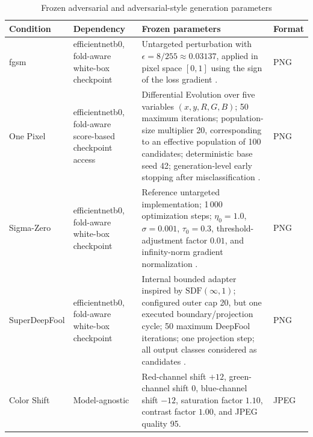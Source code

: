 \begin{table}[H]
\centering
\scriptsize
\renewcommand{\arraystretch}{1.18}
\setlength{\tabcolsep}{4pt}
\caption{Frozen adversarial and adversarial-style generation parameters}
\label{tab:implementation-adversarial-parameters}
\begin{tabularx}{\textwidth}{@{}p{} p{} X p{}@{}}
\toprule
\textbf{Condition} &
\textbf{Dependency} &
\textbf{Frozen parameters} &
\textbf{Format} \\
\midrule

\gls{fgsm}
&
\gls{efficientnetb0}, fold-aware white-box checkpoint
&
Untargeted perturbation with
\(\epsilon = 8/255 \approx 0.03137\), applied in pixel space
\([0,1]\) using the sign of the loss gradient
\cite{goodfellow2015explaining}.
&
PNG \\

One Pixel
&
\gls{efficientnetb0}, fold-aware score-based checkpoint access
&
Differential Evolution over five variables
\((x,y,R,G,B)\); 50 maximum iterations; population-size multiplier 20,
corresponding to an effective population of 100 candidates;
deterministic base seed 42; generation-level early stopping after misclassification
\cite{su2019onepixel}.
&
PNG \\

Sigma-Zero
&
\gls{efficientnetb0}, fold-aware white-box checkpoint
&
Reference untargeted implementation; 1\,000 optimization steps;
\(\eta_0 = 1.0\), \(\sigma = 0.001\), \(\tau_0 = 0.3\),
threshold-adjustment factor \(0.01\), and infinity-norm gradient
normalization \cite{zhao2024sigmazero}.
&
PNG \\

SuperDeepFool
&
\gls{efficientnetb0}, fold-aware white-box checkpoint
&
Internal bounded adapter inspired by \(\mathrm{SDF}(\infty,1)\);
configured outer cap 20, but one executed boundary/projection cycle;
50 maximum DeepFool iterations; one projection step; all output classes
considered as candidates \cite{zhang2024superdeepfool}.
&
PNG \\

Color Shift
&
Model-agnostic
&
Red-channel shift \(+12\), green-channel shift \(0\), blue-channel shift
\(-12\), saturation factor \(1.10\), contrast factor \(1.00\), and JPEG
quality 95.
&
JPEG \\

\bottomrule
\end{tabularx}
\end{table}

